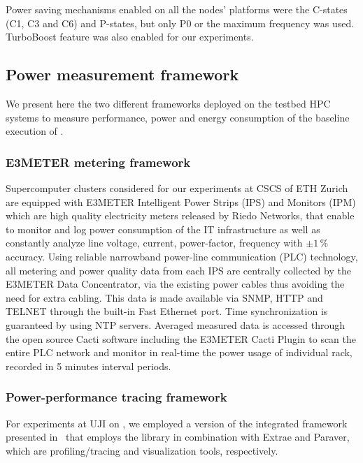 Power saving mechanisms  enabled on all the nodes'  platforms were the
C-states (C1,  C3 and  C6) and  P-states, but only  P0 or  the maximum
frequency  was  used. TurboBoost  feature  was  also  enabled for  our
experiments.

\subsection{Power measurement framework}
\label{subsec:3.3}

We present here  the two different frameworks deployed  on the testbed
HPC  systems  to measure  performance,  power and  energy
consumption of the baseline execution of \cosmoart.

\subsubsection{E3METER metering framework}

Supercomputer clusters  considered for our experiments at  CSCS of ETH
Zurich are  equipped with E3METER  Intelligent Power Strips  (IPS) and
Monitors (IPM)  which are high quality electricity  meters released by
Riedo Networks,  that enable to  monitor and log power  consumption of
the  IT infrastructure  as well  as constantly  analyze  line voltage,
current,  power-factor,  frequency  with $\pm1\,\%$  accuracy.   Using
reliable  narrowband power-line  communication  (PLC) technology,  all
metering and power quality data  from each IPS are centrally collected
by the E3METER  Data Concentrator, via the existing  power cables thus
avoiding the need for extra  cabling.  This data is made available via
SNMP, HTTP and  TELNET through the built-in Fast  Ethernet port.  Time
synchronization is guaranteed by  using NTP servers. Averaged measured
data is accessed through the  open source Cacti software including the
E3METER Cacti  Plugin to  scan the entire  PLC network and  monitor in
real-time the  power usage of  individual rack, recorded in  5 minutes
interval periods.

\subsubsection{Power-performance tracing framework}

For  experiments  at UJI  on  \tinto, we  employed  a  version of  the
integrated  framework presented  in~\cite{energy13}  that employs  the
\pmlib  library in  combination  with Extrae  and  Paraver, which  are
profiling/tracing and visualization tools, respectively.

